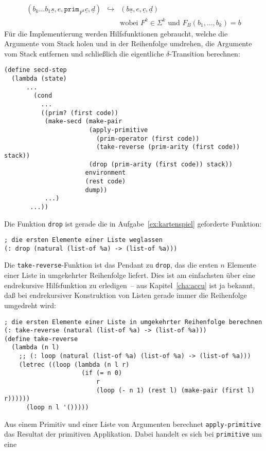 %
\begin{eqnarray*}
  (b_k\ldots b_1 \underline{s}, e, \mathtt{prim}_{F^k}\underline{c}, \underline{d})
  &\hookrightarrow&
  (b\underline{s}, e, \underline{c}, \underline{d})
  \\ && \textrm{wobei $F^k\in\Sigma^k$ und $F_B(b_1,\ldots,b_k) = b$}
\end{eqnarray*}
%
Für die Implementierung werden Hilfsfunktionen gebraucht, welche die
Argumente vom Stack holen und in der Reihenfolge umdrehen, die
Argumente vom Stack entfernen und schließlich die eigentliche
$\delta$-Transition berechnen:
%
\begin{verbatim}
(define secd-step
  (lambda (state)
      ...
        (cond
          ...
          ((prim? (first code))
           (make-secd (make-pair
                       (apply-primitive
                         (prim-operator (first code))
                         (take-reverse (prim-arity (first code)) stack))
                       (drop (prim-arity (first code)) stack))
                      environment
                      (rest code)
                      dump))
           ...)
       ...))
\end{verbatim}
%
Die Funktion \texttt{drop} ist gerade die in
Aufgabe~\ref{ex:kartenspiel} geforderte Funktion:
%
\begin{verbatim}
; die ersten Elemente einer Liste weglassen
(: drop (natural (list-of %a) -> (list-of %a)))
\end{verbatim}
%
Die \texttt{take-reverse}-Funktion ist das Pendant zu \texttt{drop},
das die ersten $n$ Elemente einer Liste in umgekehrter Reihenfolge
liefert.  Dies ist am einfachsten über eine endrekursive Hilfsfunktion
zu erledigen~-- aus Kapitel~\ref{cha:accu} ist ja bekannt, daß bei
endrekursiver Konstruktion von Listen gerade immer die Reihenfolge
umgedreht wird:
%
\begin{verbatim}
; die ersten Elemente einer Liste in umgekehrter Reihenfolge berechnen
(: take-reverse (natural (list-of %a) -> (list-of %a)))
(define take-reverse
  (lambda (n l)
    ;; (: loop (natural (list-of %a) (list-of %a) -> (list-of %a)))
    (letrec ((loop (lambda (n l r)
                     (if (= n 0)
                         r
                         (loop (- n 1) (rest l) (make-pair (first l) r))))))
      (loop n l '()))))
\end{verbatim}
%
Aus einem Primitiv und einer Liste von Argumenten berechnet
\texttt{apply-primitive} das Resultat der primitiven Applikation.
Dabei handelt es sich bei \texttt{primitive} um eine

